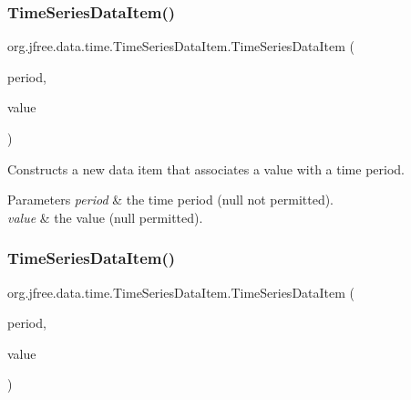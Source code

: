 \subsubsection{\texorpdfstring{Time\+Series\+Data\+Item()}{TimeSeriesDataItem()}\hspace{0.1cm}{\footnotesize\ttfamily [1/2]}}
{\footnotesize\ttfamily org.\+jfree.\+data.\+time.\+Time\+Series\+Data\+Item.\+Time\+Series\+Data\+Item (\begin{DoxyParamCaption}\item[{\mbox{\hyperlink{classorg_1_1jfree_1_1data_1_1time_1_1_regular_time_period}{Regular\+Time\+Period}}}]{period,  }\item[{Number}]{value }\end{DoxyParamCaption})}

Constructs a new data item that associates a value with a time period.


\begin{DoxyParams}{Parameters}
{\em period} & the time period ({\ttfamily null} not permitted). \\
\hline
{\em value} & the value ({\ttfamily null} permitted). \\
\hline
\end{DoxyParams}
\mbox{\label{classorg_1_1jfree_1_1data_1_1time_1_1_time_series_data_item_a4519034ff3a96ba5057ef380492964a3}} 
\subsubsection{\texorpdfstring{Time\+Series\+Data\+Item()}{TimeSeriesDataItem()}\hspace{0.1cm}{\footnotesize\ttfamily [2/2]}}
{\footnotesize\ttfamily org.\+jfree.\+data.\+time.\+Time\+Series\+Data\+Item.\+Time\+Series\+Data\+Item (\begin{DoxyParamCaption}\item[{\mbox{\hyperlink{classorg_1_1jfree_1_1data_1_1time_1_1_regular_time_period}{Regular\+Time\+Period}}}]{period,  }\item[{double}]{value }\end{DoxyParamCaption})}

